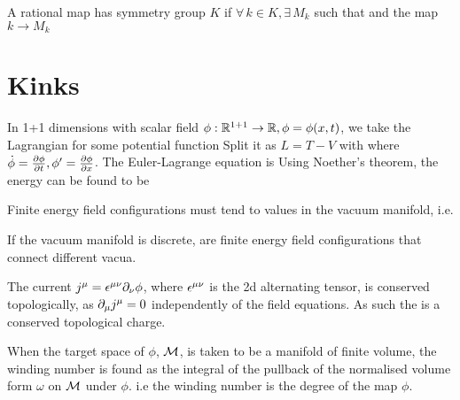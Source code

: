 \documentclass{article}
\begin{document}
\begin{definition}
A rational map has symmetry group $K$ if $\forall \, k \in K, \exists \, M_k$ such that 
and the map $k \to M_k$
\end{definition}


\section{Kinks}

In 1+1 dimensions with scalar field $\phi:\mbb{R}^{1+1} \to \mbb{R}, \phi=\phi(x,t)$, we take the Lagrangian 
for some potential function Split it as $L=T-V$ with 
where $\dot{\phi} = \pd[\phi]{t}, \phi^\prime = \pd[\phi]{x}$. The Euler-Lagrange equation is 
Using Noether's theorem, the energy can be found to be 

\begin{prop}
Finite energy field configurations must tend to values in the vacuum manifold, i.e. 
\end{prop}

\begin{definition}[Kinks]
If the vacuum manifold is discrete,  are finite energy field configurations that connect different vacua. 
\end{definition}

\begin{definition}
The current $j^\mu = \eps^{\mu\nu}\del_\nu \phi$, where $\eps^{\mu\nu}$ is the 2d alternating tensor, is conserved topologically, as $\del_\mu j^\mu = 0$ independently of the field equations. As such the 
is a conserved topological charge.
\end{definition}

\begin{prop}
When the target space of $\phi$, $\mc{M}$, is taken to be a manifold of finite volume, the winding number is found as the integral of the pullback of the normalised volume form $\omega$ on $\mc{M}$ under $\phi$. i.e the winding number is the degree of the map $\phi$. 
\end{prop}
\end{document}
